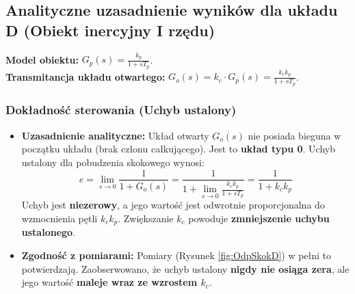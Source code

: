 \documentclass[12pt,a4paper]{article}
\begin{document}
	\subsection{Analityczne uzasadnienie wyników dla układu D (Obiekt inercyjny I rzędu)}
	
	\textbf{Model obiektu:} $G_p(s) = \frac{k_p}{1 + sT_p}$. \\
	\textbf{Transmitancja układu otwartego:} $G_o(s) = k_c \cdot G_p(s) = \frac{k_c k_p}{1 + sT_p}$.
	
	\subsubsection{Dokładność sterowania (Uchyb ustalony)}
	\begin{itemize}
		\item \textbf{Uzasadnienie analityczne:} Układ otwarty $G_o(s)$ nie posiada bieguna w początku układu (brak członu całkującego). Jest to \textbf{układ typu 0}. Uchyb ustalony dla pobudzenia skokowego wynosi:
		\[
		e = \lim_{s \to 0} \frac{1}{1 + G_o(s)} = \frac{1}{1 + \lim_{s \to 0} \frac{k_c k_p}{1 + sT_p}} = \frac{1}{1 + k_c k_p}
		\]
		Uchyb jest \textbf{niezerowy}, a jego wartość jest odwrotnie proporcjonalna do wzmocnienia pętli $k_c k_p$. Zwiększanie $k_c$ powoduje \textbf{zmniejszenie uchybu ustalonego}.
		
		\item \textbf{Zgodność z pomiarami:} Pomiary (Rysunek \ref{fig:OdpSkokD}) w pełni to potwierdzają. Zaobserwowano, że uchyb ustalony \textbf{nigdy nie osiąga zera}, ale jego wartość \textbf{maleje wraz ze wzrostem $k_c$}.
	\end{itemize}
	
\end{document}
